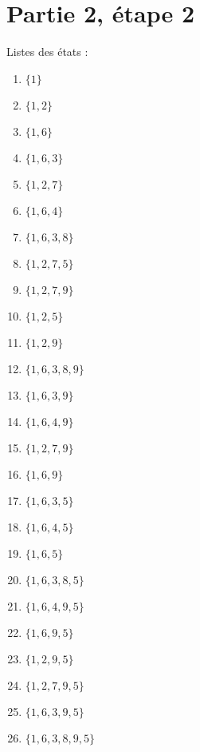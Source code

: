 \documentclass[12pt,french,a4paper]{article}
\begin{document}
\section*{Partie 2, étape 2}
Listes des états : 
\begin{multicols}{3}
\begin{enumerate}[(1) :]
\item $\{1\}$
\item $\{1,2\}$
\item $\{1,6\}$
\item $\{1,6,3\}$
\item $\{1,2,7\}$
\item $\{1,6,4\}$
\item $\{1,6,3,8\}$
\item $\{1,2,7,5\}$
\item $\{1,2,7,9\}$
\item $\{1,2,5\}$
\item $\{1,2,9\}$
\item $\{1,6,3,8,9\}$
\item $\{1,6,3,9\}$
\item $\{1,6,4,9\}$
\item $\{1,2,7,9\}$
\item $\{1,6,9\}$
\item $\{1,6,3,5\}$
\item $\{1,6,4,5\}$
\item $\{1,6,5\}$
\item $\{1,6,3,8,5\}$
\item $\{1,6,4,9,5\}$
\item $\{1,6,9,5\}$
\item $\{1,2,9,5\}$
\item $\{1,2,7,9,5\}$
\item $\{1,6,3,9,5\}$
\item $\{1,6,3,8,9,5\}$
\end{enumerate}
\end{multicols}
\end{document}
